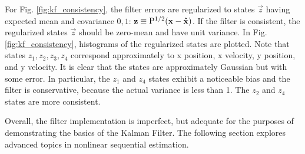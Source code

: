For Fig. \ref{fig:kf_consistency}, the filter errors are regularized to states $\vec{z}$ having expected mean and covariance $0,1$: $\mathrm{\mathbf{z}} \equiv \mathrm{P}^{1/2}(\mathrm{\mathbf{x}}-\mathrm{\mathbf{\hat{x}}})$.
If the filter is consistent, the regularized states $\vec{z}$ should be zero-mean and have unit variance.
In Fig. \ref{fig:kf_consistency}, histograms of the regularized states are plotted.
Note that states $z_1,z_2,z_3,z_4$ correspond approximately to x position, x velocity, y position, and y velocity.
It is clear that the states are approximately Gaussian but with some error.
In particular, the $z_1$ and $z_4$ states exhibit a noticeable bias and the filter is conservative, because the actual variance is less than 1.
The $z_2$ and $z_4$ states are more consistent.

Overall, the filter implementation is imperfect, but adequate for the purposes of demonstrating the basics of the Kalman Filter.
The following section explores advanced topics in nonlinear sequential estimation.